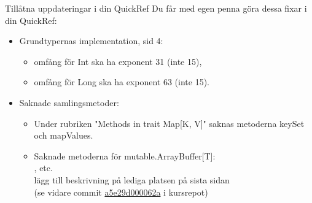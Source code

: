 \begin{Slide}{Tillåtna uppdateringar i din QuickRef}
Du får med egen penna göra dessa fixar i din QuickRef:
\begin{itemize}
\item Grundtypernas implementation, sid 4: 
\begin{itemize}

\item omfång för Int ska ha exponent 31 (inte 15), 
\item omfång för Long ska ha exponent 63 (inte 15).
\end{itemize}

\item Saknade samlingsmetoder: 
\begin{itemize}
\item Under rubriken "Methods in trait Map[K, V]" saknas metoderna keySet och mapValues. 
\item Saknade metoderna för mutable.ArrayBuffer[T]: \\     , etc. \\ lägg till beskrivning på lediga platsen på sista sidan \\ 
(se vidare commit \href{https://github.com/lunduniversity/introprog/commit/a5e29d000062}{a5e29d000062a} i kursrepot)
\end{itemize}
\end{itemize}
\end{Slide}


